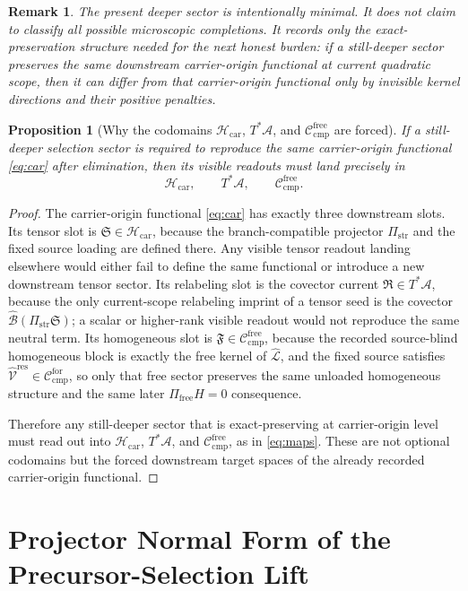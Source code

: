 \documentclass[11pt]{article}
\newcommand{\Sub}{\mathcal A}
\newcommand{\ResidualLift}{\widehat{\mathcal V}^{\mathrm{res}}}
\newcommand{\SubGaugeVec}{\widehat{\mathcal B}}
\newcommand{\SubReducedEin}{\widehat{\mathcal L}}
\newcommand{\CompFree}{\mathscr C_{\mathrm{cmp}}^{\mathrm{free}}}
\newcommand{\CompForced}{\mathscr C_{\mathrm{cmp}}^{\mathrm{for}}}
\newcommand{\CarrierClass}{\mathscr H_{\mathrm{car}}}
\newcommand{\CarrierProj}{\Pi_{\mathrm{str}}}
\newcommand{\CarrierSeed}{\mathfrak S}
\newcommand{\RelabelSeed}{\mathfrak R}
\newcommand{\FreeSeed}{\mathfrak F}
\newtheorem{proposition}{Proposition}
\newtheorem{remark}{Remark}
\begin{document}
\begin{remark}
The present deeper sector is intentionally minimal. It does not claim to classify all possible microscopic completions. It records only the exact-preservation structure needed for the next honest burden: if a still-deeper sector preserves the same downstream carrier-origin functional at current quadratic scope, then it can differ from that carrier-origin functional only by invisible kernel directions and their positive penalties.
\end{remark}

\begin{proposition}[Why the codomains \(\CarrierClass\), \(T^*\Sub\), and \(\CompFree\) are forced]
\label{prop:codomains}
If a still-deeper selection sector is required to reproduce the same carrier-origin functional \eqref{eq:car} after elimination, then its visible readouts must land precisely in
\[
\CarrierClass,\qquad
T^*\Sub,\qquad
\CompFree.
\]
\end{proposition}

\begin{proof}
The carrier-origin functional \eqref{eq:car} has exactly three downstream slots. Its tensor slot is \(\CarrierSeed\in\CarrierClass\), because the branch-compatible projector \(\CarrierProj\) and the fixed source loading are defined there. Any visible tensor readout landing elsewhere would either fail to define the same functional or introduce a new downstream tensor sector. Its relabeling slot is the covector current \(\RelabelSeed\in T^*\Sub\), because the only current-scope relabeling imprint of a tensor seed is the covector \(\SubGaugeVec(\CarrierProj\CarrierSeed)\); a scalar or higher-rank visible readout would not reproduce the same neutral term. Its homogeneous slot is \(\FreeSeed\in\CompFree\), because the recorded source-blind homogeneous block is exactly the free kernel of \(\SubReducedEin\), and the fixed source satisfies \(\ResidualLift\in\CompForced\), so only that free sector preserves the same unloaded homogeneous structure and the same later \(\Pi_{\mathrm{free}}H=0\) consequence.

Therefore any still-deeper sector that is exact-preserving at carrier-origin level must read out into \(\CarrierClass\), \(T^*\Sub\), and \(\CompFree\), as in \eqref{eq:maps}. These are not optional codomains but the forced downstream target spaces of the already recorded carrier-origin functional.
\end{proof}

\section{Projector Normal Form of the Precursor-Selection Lift}
\end{document}
